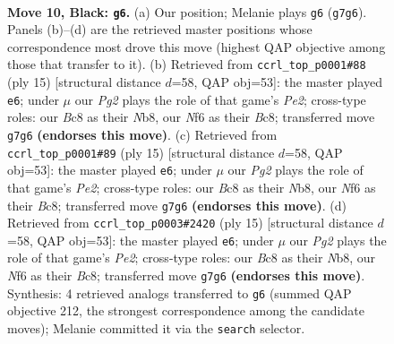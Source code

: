 \documentclass[11pt]{article}
\begin{document}
\clearpage

\begin{figure}[p]\centering
\begin{subfigure}{0.46\textwidth}\centering
\resizebox{\linewidth}{!}{%
\newchessgame
\chessboard[
  setfen={r1bq1rk1/pp4pp/n1pb1n2/3p1p2/3P3N/6P1/PP1NPPBP/R1BQR1K1 b - - 5 10},
  showmover=false,
  pgfstyle=straightmove, color=movearrow, markmove={g7-g6}
]}
\caption{}
\end{subfigure}\hfill
\begin{subfigure}{0.46\textwidth}\centering
\resizebox{\linewidth}{!}{%
\newchessgame
\chessboard[
  setfen={rnbq1rk1/pp2ppbp/5np1/3pN3/3P4/6P1/PP2PPBP/RNBQ1RK1 b - - 3 8},
  showmover=false,
  pgfstyle=straightmove, color=movearrow, markmove={e7-e6}
]}
\caption{}
\end{subfigure}
\\[4pt]
\begin{subfigure}{0.46\textwidth}\centering
\resizebox{\linewidth}{!}{%
\newchessgame
\chessboard[
  setfen={rnbq1rk1/pp2ppbp/5np1/3pN3/3P4/6P1/PP2PPBP/RNBQ1RK1 b - - 3 8},
  showmover=false,
  pgfstyle=straightmove, color=movearrow, markmove={e7-e6}
]}
\caption{}
\end{subfigure}\hfill
\begin{subfigure}{0.46\textwidth}\centering
\resizebox{\linewidth}{!}{%
\newchessgame
\chessboard[
  setfen={rnbq1rk1/pp2ppbp/5np1/3pN3/3P4/6P1/PP2PPBP/RNBQ1RK1 b - - 1 8},
  showmover=false,
  pgfstyle=straightmove, color=movearrow, markmove={e7-e6}
]}
\caption{}
\end{subfigure}
\caption{\textbf{Move 10, Black: \texttt{g6}.} (a) Our position; Melanie plays \texttt{g6} (\texttt{g7g6}). Panels (b)--(d) are the retrieved master positions whose correspondence most drove this move (highest QAP objective among those that transfer to it). (b) Retrieved from \texttt{ccrl\_top\_p0001\#88} (ply 15) [structural distance $d$=58, QAP obj=53]: the master played \texttt{e6}; under $\mu$ our \emph{Pg2} plays the role of that game's \emph{Pe2}; cross-type roles: our \emph{B}c8 as their \emph{N}b8, our \emph{N}f6 as their \emph{B}c8; transferred move \texttt{g7g6} \textbf{(endorses this move)}. (c) Retrieved from \texttt{ccrl\_top\_p0001\#89} (ply 15) [structural distance $d$=58, QAP obj=53]: the master played \texttt{e6}; under $\mu$ our \emph{Pg2} plays the role of that game's \emph{Pe2}; cross-type roles: our \emph{B}c8 as their \emph{N}b8, our \emph{N}f6 as their \emph{B}c8; transferred move \texttt{g7g6} \textbf{(endorses this move)}. (d) Retrieved from \texttt{ccrl\_top\_p0003\#2420} (ply 15) [structural distance $d$=58, QAP obj=53]: the master played \texttt{e6}; under $\mu$ our \emph{Pg2} plays the role of that game's \emph{Pe2}; cross-type roles: our \emph{B}c8 as their \emph{N}b8, our \emph{N}f6 as their \emph{B}c8; transferred move \texttt{g7g6} \textbf{(endorses this move)}. Synthesis: 4 retrieved analogs transferred to \texttt{g6} (summed QAP objective 212, the strongest correspondence among the candidate moves); Melanie committed it via the \texttt{search} selector.}
\label{fig:thought-m19}
\end{figure}
\end{document}
